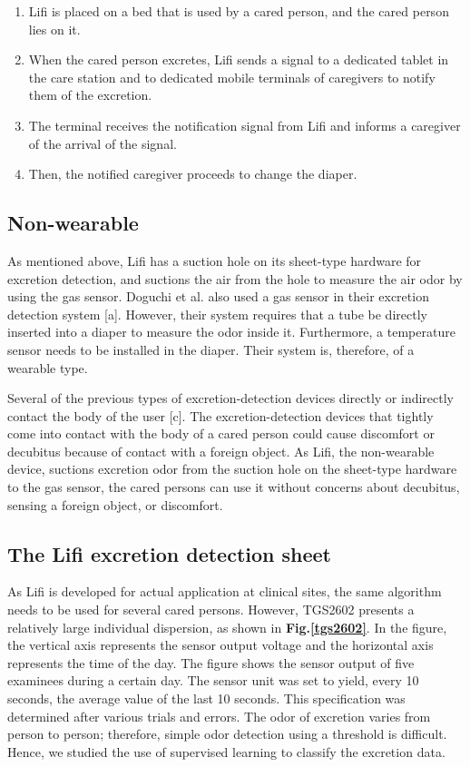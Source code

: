 \documentclass[publish,JRM,paper]{jaciiiarticle}
\begin{document}
\begin{enumerate}
    \item Lifi is placed on a bed that is used by a cared person, and the cared person lies on it.
    \item When the cared person excretes, Lifi sends a signal to a dedicated tablet in the care station and to dedicated mobile terminals of caregivers to notify them of the excretion.
    \item The terminal receives the notification signal from Lifi and informs a caregiver of the arrival of the signal.
    \item Then, the notified caregiver proceeds to change the diaper.
\end{enumerate}

\subsection{Non-wearable}
As mentioned above, Lifi has a suction hole on its sheet-type hardware for excretion detection, and suctions the air from the hole to measure the air odor by using the gas sensor. Doguchi et al. also used a gas sensor in their excretion detection system \cite{doguchi2}[a]. However, their system requires that a tube be directly inserted into a diaper to measure the odor inside it. Furthermore, a temperature sensor needs to be installed in the diaper. Their system is, therefore, of a wearable type.

Several of the previous types of excretion-detection devices directly or indirectly contact the body of the user \cite{mizukawa}[c]. The excretion-detection devices that tightly come into contact with the body of a cared person could cause discomfort or decubitus because of contact with a foreign object. As Lifi, the non-wearable device, suctions excretion odor from the suction hole on the sheet-type hardware to the gas sensor, the cared persons can use it without concerns about decubitus, sensing a foreign object, or discomfort.

\subsection{The Lifi excretion detection sheet}
As Lifi is developed for actual application at clinical sites, the same algorithm needs to be used for several cared persons. However, TGS2602 presents a relatively large individual dispersion, as shown in {\bf Fig.\ref{tgs2602}}. In the figure, the vertical axis represents the sensor output voltage and the horizontal axis represents the time of the day. The figure shows the sensor output of five examinees during a certain day. The sensor unit was set to yield, every 10 seconds, the average value of the last 10 seconds. This specification was determined after various trials and errors. The odor of excretion varies from person to person; therefore, simple odor detection using a threshold is difficult. Hence, we studied the use of supervised learning to classify the excretion data.
\end{document}
